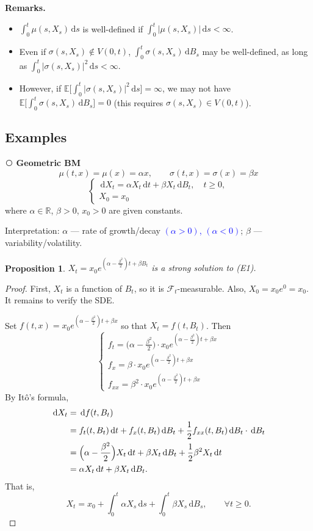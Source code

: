 \documentclass[11pt]{article}
\newcommand{\E}{\mathbb{E}}
\newcommand{\R}{\mathbb{R}}
\newcommand{\F}{\mathcal{F}}
\newcommand{\dd}{\,\mathrm{d}}
\newcommand{\cnum}[1]{\textcircled{\raisebox{-0.6pt}{\scriptsize #1}}} %
\newcommand{\ann}[1]{\textcolor{blue}{#1}}
\theoremstyle{definition}
\theoremstyle{plain}
\newtheorem{proposition}{Proposition}[section]
\begin{document}
\noindent\textbf{Remarks.}
\begin{itemize}
\item $\int_0^t\mu(s,X_s)\dd s$ is well-defined if $\int_0^t|\mu(s,X_s)|\dd s<\infty$.
\item Even if $\sigma(s,X_s)\notin V(0,t)$, $\int_0^t\sigma(s,X_s)\dd B_s$ may be
      well-defined, as long as $\int_0^t|\sigma(s,X_s)|^2\dd s<\infty$.
\item However, if $\E\bigl[\int_0^t|\sigma(s,X_s)|^2\dd s\bigr]=\infty$, we may not
      have $\E\bigl[\int_0^t\sigma(s,X_s)\dd B_s\bigr]=0$
      (this requires $\sigma(s,X_s)\in V(0,t)$).
\end{itemize}

\subsection*{Examples}

\noindent\cnum{1} \textbf{Geometric BM}
\[
  \mu(t,x)=\mu(x)=\alpha x,\qquad \sigma(t,x)=\sigma(x)=\beta x
\]
\[
  \begin{cases}
    \dd X_t=\alpha X_t\dd t+\beta X_t\dd B_t, \quad t\ge0,\\
    X_0=x_0
  \end{cases}
  \tag*{(E1)}
\]
where $\alpha\in\R$, $\beta>0$, $x_0>0$ are given constants.

\medskip
\noindent Interpretation: $\alpha$ --- rate of growth/decay \ann{$(\alpha>0)$,\; $(\alpha<0)$};
$\beta$ --- variability/volatility.

\begin{proposition}
$X_t=x_0e^{(\alpha-\frac{\beta^2}{2})t+\beta B_t}$ is a strong solution to (E1).
\end{proposition}

\begin{proof}
First, $X_t$ is a function of $B_t$, so it is $\F_t$-measurable.
Also, $X_0=x_0e^0=x_0$. It remains to verify the SDE.

\noindent Set $f(t,x)=x_0e^{(\alpha-\frac{\beta^2}{2})t+\beta x}$ so that
$X_t=f(t,B_t)$. Then
\[
  \begin{cases}
    f_t=\bigl(\alpha-\frac{\beta^2}{2}\bigr)\cdot x_0e^{(\alpha-\frac{\beta^2}{2})t+\beta x}\\[6pt]
    f_x=\beta\cdot x_0e^{(\alpha-\frac{\beta^2}{2})t+\beta x}\\[6pt]
    f_{xx}=\beta^2\cdot x_0e^{(\alpha-\frac{\beta^2}{2})t+\beta x}
  \end{cases}
\]
By It\^o's formula,
\begin{align*}
  \dd X_t
    &=\dd f(t,B_t)\\
    &=f_t(t,B_t)\dd t+f_x(t,B_t)\dd B_t+\frac12f_{xx}(t,B_t)\dd B_t\cdot\dd B_t\\
    &=\Bigl(\alpha-\frac{\beta^2}{2}\Bigr)X_t\dd t+\beta X_t\dd B_t+\frac12\beta^2X_t\dd t\\
    &=\alpha X_t\dd t+\beta X_t\dd B_t .
\end{align*}
That is,
\[
  X_t=x_0+\int_0^t\alpha X_s\dd s+\int_0^t\beta X_s\dd B_s ,\qquad \forall t\ge0 .
\]
\end{proof}
\end{document}
